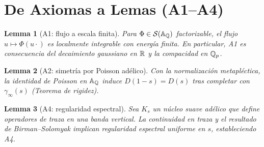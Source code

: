 \section{De Axiomas a Lemas (A1--A4)}

\newtheorem{theoremE}{Theorem}[section]
\newtheorem{lemmaE}[theoremE]{Lemma}

\begin{lemmaE}[A1: flujo a escala finita]
Para $\Phi\in\mathcal S(\Bbb A_\Bbb Q)$ factorizable, el flujo $u\mapsto \Phi(u\cdot)$
es localmente integrable con energía finita. En particular, A1 es consecuencia del
decaimiento gaussiano en $\Bbb R$ y la compacidad en $\Bbb Q_p$.
\end{lemmaE}

\begin{lemmaE}[A2: simetría por Poisson adélico]
Con la normalización metapléctica, la identidad de Poisson en $\Bbb A_\Bbb Q$
induce $D(1-s)=D(s)$ tras completar con $\gamma_\infty(s)$ (Teorema de rigidez).
\end{lemmaE}

\begin{lemmaE}[A4: regularidad espectral]
Sea $K_s$ un núcleo suave adélico que define operadores de traza en una banda vertical.
La continuidad en traza y el resultado de Birman--Solomyak implican regularidad
espectral uniforme en $s$, estableciendo A4.
\end{lemmaE}
